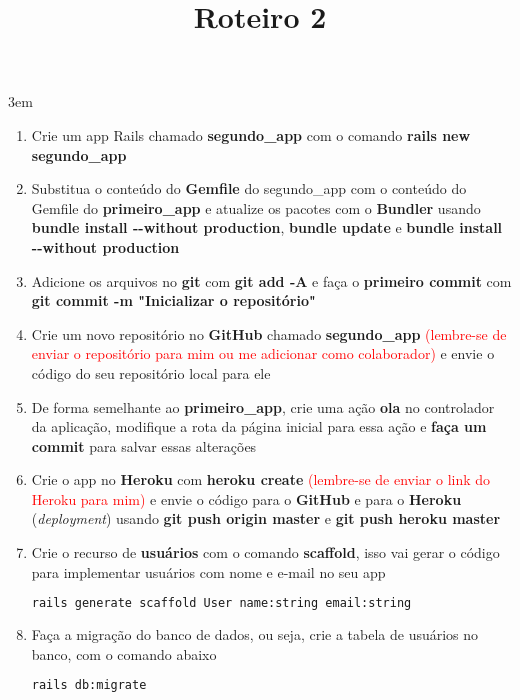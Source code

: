 \documentclass[a4paper,12pt]{article}
\title{Roteiro 2}
\begin{document}
\maketitle

\emergencystretch 3em

\setlength{\leftmargini}{0pt}
\begin{enumerate}
  \item Crie um app Rails chamado \textbf{segundo\_app} com o comando \textbf{rails new segundo\_app}
  \item Substitua o conteúdo do \textbf{Gemfile} do segundo\_app com o conteúdo do Gemfile do \textbf{primeiro\_app} e atualize os pacotes com o \textbf{Bundler} usando \textbf{bundle install {-}-without production}, \textbf{bundle update} e \textbf{bundle install {-}-without production}
  \item Adicione os arquivos no \textbf{git} com \textbf{git add -A} e faça o \textbf{primeiro commit} com \textbf{git commit -m "Inicializar o repositório"}
  \item Crie um novo repositório no \textbf{GitHub} chamado \textbf{segundo\_app} \textcolor{red}{(lembre-se de enviar o repositório para mim ou me adicionar como colaborador)} e envie o código do seu repositório local para ele
  \item De forma semelhante ao \textbf{primeiro\_app}, crie uma ação \textbf{ola} no controlador da aplicação, modifique a rota da página inicial para essa ação e \textbf{faça um commit} para salvar essas alterações
  \item Crie o app no \textbf{Heroku} com \textbf{heroku create} \textcolor{red}{(lembre-se de enviar o link do Heroku para mim)} e envie o código para o \textbf{GitHub} e para o \textbf{Heroku} (\textit{deployment}) usando \textbf{git push origin master} e \textbf{git push heroku master}
  \item Crie o recurso de \textbf{usuários} com o comando \textbf{scaffold}, isso vai gerar o código para implementar usuários com nome e e-mail no seu app

    \begin{lstlisting}[language=Bash]
rails generate scaffold User name:string email:string
    \end{lstlisting}

  \item Faça a migração do banco de dados, ou seja, crie a tabela de usuários no banco, com o comando abaixo

    \begin{lstlisting}[language=Bash]
rails db:migrate
    \end{lstlisting}


\end{enumerate}
\end{document}
